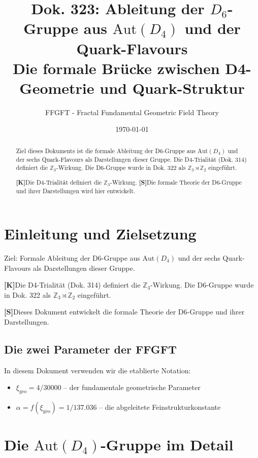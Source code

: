 \documentclass[11pt,a4paper]{article}
\title{Dok. 323: Ableitung der $D_6$-Gruppe aus $\text{Aut}(D_4)$ und der Quark-Flavours\\
	\large Die formale Brücke zwischen D4-Geometrie und Quark-Struktur}
\author{FFGFT - Fractal Fundamental Geometric Field Theory}
\date{\today}
\newcommand{\xigeo}{\xi_{\text{geo}}}
\newcommand{\Kstatus}{\textbf{[K]}}
\newcommand{\Sstatus}{\textbf{[S]}}
\begin{document}
	
	\maketitle
	
	\begin{abstract}
		Ziel dieses Dokuments ist die formale Ableitung der D6-Gruppe aus $\text{Aut}(D_4)$ und der sechs Quark-Flavours als Darstellungen dieser Gruppe. Die D4-Trialität (Dok. 314) definiert die $\mathbb{Z}_3$-Wirkung. Die D6-Gruppe wurde in Dok. 322 als $\mathbb{Z}_3 \rtimes \mathbb{Z}_2$ eingeführt.
		
		\Kstatus Die D4-Trialität definiert die $\mathbb{Z}_3$-Wirkung.
		\Sstatus Die formale Theorie der D6-Gruppe und ihrer Darstellungen wird hier entwickelt.
	\end{abstract}
	
	\tableofcontents
	\newpage
	
	\section{Einleitung und Zielsetzung}
	
	Ziel: Formale Ableitung der D6-Gruppe aus $\text{Aut}(D_4)$ und der sechs Quark-Flavours als Darstellungen dieser Gruppe.
	
	\Kstatus Die D4-Trialität (Dok. 314) definiert die $\mathbb{Z}_3$-Wirkung. Die D6-Gruppe wurde in Dok. 322 als $\mathbb{Z}_3 \rtimes \mathbb{Z}_2$ eingeführt.
	
	\Sstatus Dieses Dokument entwickelt die formale Theorie der D6-Gruppe und ihrer Darstellungen.
	
	\subsection{Die zwei Parameter der FFGFT}
	
	In diesem Dokument verwenden wir die etablierte Notation:
	\begin{itemize}
		\item $\xigeo = 4/30000$ – der fundamentale geometrische Parameter
		\item $\alpha = f(\xigeo) = 1/137.036$ – die abgeleitete Feinstrukturkonstante
	\end{itemize}
	
	\section{Die $\text{Aut}(D_4)$-Gruppe im Detail}
	
\end{document}
